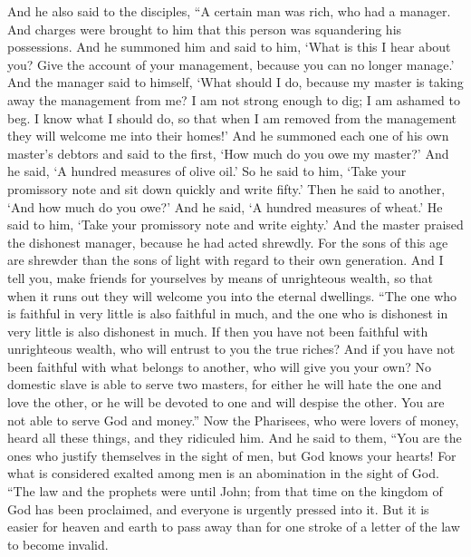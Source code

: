 \begin{biblechapter} %
 And he also said to the disciples, “A certain man was rich, who had a manager. And charges were brought to him that this person was squandering his possessions.
\verse And he summoned him and said to him, ‘What is this I hear about you? Give the account of your management, because you can no longer manage.’
\verse And the manager said to himself, ‘What should I do, because my master is taking away the management from me? I am not strong enough to dig; I am ashamed to beg.
\verse I know what I should do, so that when I am removed from the management they will welcome me into their homes!’
\verse And he summoned each one of his own master’s debtors and said to the first, ‘How much do you owe my master?’
\verse And he said, ‘A hundred measures of olive oil.’ So he said to him, ‘Take your promissory note and sit down quickly and write fifty.’
\verse Then he said to another, ‘And how much do you owe?’ And he said, ‘A hundred measures of wheat.’ He said to him, ‘Take your promissory note and write eighty.’
\verse And the master praised the dishonest manager, because he had acted shrewdly. For the sons of this age are shrewder than the sons of light with regard to their own generation.
\verse And I tell you, make friends for yourselves by means of unrighteous wealth, so that when it runs out they will welcome you into the eternal dwellings.
\verse “The one who is faithful in very little is also faithful in much, and the one who is dishonest in very little is also dishonest in much.
\verse If then you have not been faithful with unrighteous wealth, who will entrust to you the true riches?
\verse And if you have not been faithful with what belongs to another, who will give you your own?
\verse No domestic slave is able to serve two masters, for either he will hate the one and love the other, or he will be devoted to one and will despise the other. You are not able to serve God and money.”
 Now the Pharisees, who were lovers of money, heard all these things, and they ridiculed him.
\verse And he said to them, “You are the ones who justify themselves in the sight of men, but God knows your hearts! For what is considered exalted among men is an abomination in the sight of God.
\verse “The law and the prophets were until John; from that time on the kingdom of God has been proclaimed, and everyone is urgently pressed into it.
\verse But it is easier for heaven and earth to pass away than for one stroke of a letter of the law to become invalid.

\end{biblechapter}
